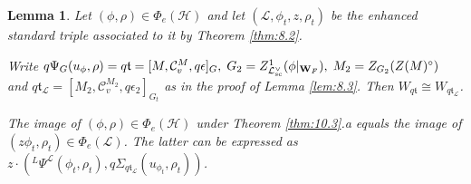 \documentclass[11pt]{amsart}
\newtheorem{lem}[thm]{Lemma}
\theoremstyle{definition}
\newcommand{\enuma}[1]{\begin{enumerate}[\textup{(}a\textup{)}] {#1} \end{enumerate}}
\newcommand{\mb}{\mathbf}
\def\cC{{\mathcal C}}
\def\cL{{\mathcal L}}
\def\cH{{\mathcal H}}
\def\ft{{\mathfrak t}}
\def\sc{{\rm sc}}
\begin{document}
\begin{lem}\label{lem:10.4}
Let $(\phi,\rho) \in \Phi_e (\cH)$ and let $(\cL,\phi_t,z,\rho_t)$ be the enhanced
standard triple associated to it by Theorem \ref{thm:8.2}. 
\enuma{
\item Write $q \Psi_G (u_\phi,\rho) = q \ft = [M,\cC_v^M,q\epsilon]_G ,\; G_2 = 
Z^1_{\cL^\vee_{\sc}}(\phi |_{\mb W_F}) ,\; M_2 = Z_{G_2}(Z(M)^\circ)$ and 
$q \ft_\cL = [M_2,\cC_v^{M_2},q\epsilon_2]_{G_t}$ as in the proof of Lemma \ref{lem:8.3}.
Then $W_{q \ft} \cong W_{q \ft_\cL}$.
\item The image of $(\phi,\rho) \in \Phi_e (\cH)$ under Theorem \ref{thm:10.3}.a
equals the image of $(z \phi_t,\rho_t) \in \Phi_e (\cL)$. The latter can be expressed
as $z \cdot ({}^L \Psi^\cL (\phi_t,\rho_t), q \Sigma_{q \ft_\cL}(u_{\phi_t},\rho_t))$.
}
\end{lem}
\end{document}
